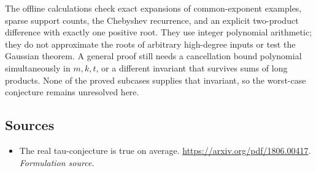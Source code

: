 \documentclass[11pt]{article}
\begin{document}
The offline calculations check exact expansions of common-exponent examples, sparse support counts, the Chebyshev recurrence, and an explicit two-product difference with exactly one positive root. They use integer polynomial arithmetic; they do not approximate the roots of arbitrary high-degree inputs or test the Gaussian theorem. A general proof still needs a cancellation bound polynomial simultaneously in $m,k,t$, or a different invariant that survives sums of long products. None of the proved subcases supplies that invariant, so the worst-case conjecture remains unresolved here.

\subsection{Sources}
\begin{itemize}
\item[S1]The real tau-conjecture is true on average.
\url{https://arxiv.org/pdf/1806.00417}.
\textit{Formulation source.}
\end{itemize}
\end{document}
